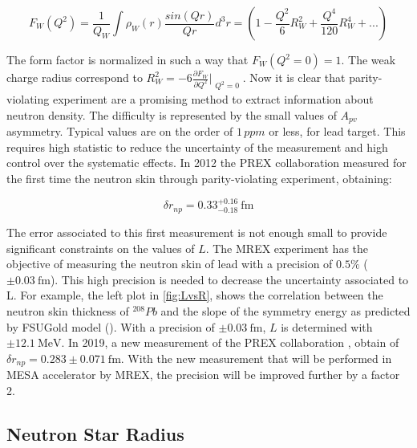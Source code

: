 \begin{equation}
F_{W}(Q^{2}) = \frac{1}{Q_{W}} \int \rho_{W}(r) \dfrac{sin(Qr)}{Qr} d^{3}r = (1 - \frac{Q^{2}}{6} R^{2}_{W} + \frac{Q^{4}}{120}R^{4}_{W} + ...)  
\end{equation}

The form factor is normalized in such a way that $F_{W}(Q^{2} = 0) = 1$. The weak charge radius correspond to $R^{2}_{W} = -6 \frac{\partial F_{W}}{\partial Q^{2}}\Bigr|_{\substack{Q^{2} = 0}}$. Now it is clear that parity-violating experiment are a promising method to extract information about neutron density. The difficulty is represented by the small values of $A_{pv}$ asymmetry. Typical values are on the order of $1 \, ppm$ or less, for lead target. This requires high statistic to reduce the uncertainty of the measurement and high control over the systematic effects. In 2012 the PREX collaboration measured for the first time the neutron skin through parity-violating experiment, obtaining:

\begin{equation} \label{eq:Prex}
\delta r_{np} = 0.33^{+0.16}_{-0.18} \SI{}{\femto \meter}
\end{equation}

The error associated to this first measurement is not enough small to provide significant constraints on the values of $L$. The MREX experiment has the objective of measuring the neutron skin of lead with a precision of $0.5 \%$  ($\pm \SI{0.03}{\femto \meter}$). This high precision is needed to decrease the uncertainty associated to L. For example, the left plot in \ref{fig:LvsR}, shows the correlation between the neutron skin thickness of $^{208}Pb$ and the slope of the symmetry energy as predicted by FSUGold model (\cite{Fattoyev_2011}). With a precision of $\pm \SI{0.03}{\femto \meter}$, $L$ is determined with $\pm \SI{12.1}{\mega \electronvolt}$. 
In 2019, a new measurement of the PREX collaboration \cite{PREX:2021umo}, obtain of $\delta r_{np} = 0.283 \pm 0.071 \SI{}{\femto \meter}$. With the new measurement that will be performed in MESA accelerator by MREX, the precision will be improved further by a factor 2.

\subsection{Neutron Star Radius}

